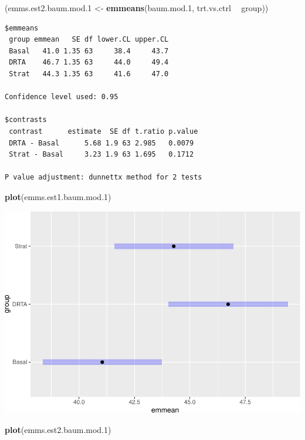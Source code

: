 \documentclass[
]{article}
\newenvironment{Shaded}{\begin{snugshade}}{\end{snugshade}}
\newcommand{\FloatTok}[1]{\textcolor[rgb]{0.00,0.00,0.81}{#1}}
\newcommand{\KeywordTok}[1]{\textcolor[rgb]{0.13,0.29,0.53}{\textbf{#1}}}
\newcommand{\NormalTok}[1]{#1}
\newcommand{\OperatorTok}[1]{\textcolor[rgb]{0.81,0.36,0.00}{\textbf{#1}}}
\newcommand{\StringTok}[1]{\textcolor[rgb]{0.31,0.60,0.02}{#1}}
\begin{document}
\begin{Shaded}
\begin{Highlighting}[]
\NormalTok{(emms.est2.baum.mod}\FloatTok{.1}\NormalTok{ <-}\StringTok{ }\KeywordTok{emmeans}\NormalTok{(baum.mod}\FloatTok{.1}\NormalTok{, trt.vs.ctrl }\OperatorTok{~}\StringTok{ }\NormalTok{group))}
\end{Highlighting}
\end{Shaded}

\begin{verbatim}
$emmeans
 group emmean   SE df lower.CL upper.CL
 Basal   41.0 1.35 63     38.4     43.7
 DRTA    46.7 1.35 63     44.0     49.4
 Strat   44.3 1.35 63     41.6     47.0

Confidence level used: 0.95 

$contrasts
 contrast      estimate  SE df t.ratio p.value
 DRTA - Basal      5.68 1.9 63 2.985   0.0079 
 Strat - Basal     3.23 1.9 63 1.695   0.1712 

P value adjustment: dunnettx method for 2 tests 
\end{verbatim}

\begin{Shaded}
\begin{Highlighting}[]
\KeywordTok{plot}\NormalTok{(emms.est1.baum.mod}\FloatTok{.1}\NormalTok{)}
\end{Highlighting}
\end{Shaded}

\includegraphics{emmeansNotes_files/figure-latex/unnamed-chunk-5-1.pdf}

\begin{Shaded}
\begin{Highlighting}[]
\KeywordTok{plot}\NormalTok{(emms.est2.baum.mod}\FloatTok{.1}\NormalTok{)}
\end{Highlighting}
\end{Shaded}
\end{document}
